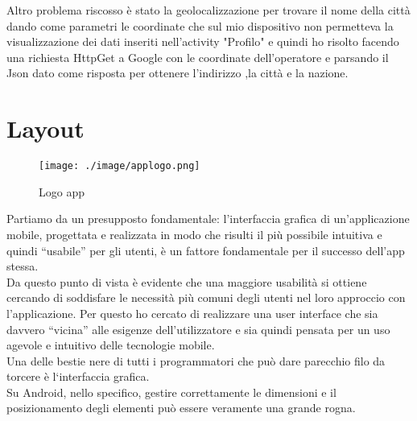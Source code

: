 Altro problema riscosso è stato la geolocalizzazione per trovare il nome della città dando come parametri le coordinate che sul mio dispositivo non permetteva la visualizzazione dei dati inseriti nell'activity "Profilo" e quindi ho risolto facendo una richiesta HttpGet a Google con le coordinate dell'operatore e parsando il Json dato come risposta per ottenere l'indirizzo ,la città e la nazione.

\section{Layout}
\vspace{2em}

\begin{wrapfigure}{L}{0.45\textwidth}
\centering
\texttt{[image: ./image/applogo.png]}
\caption{\label{fig:login}Logo app}
\end{wrapfigure}

Partiamo da un presupposto fondamentale: l’interfaccia grafica di un’applicazione mobile, progettata e realizzata in modo che risulti il più possibile intuitiva e quindi “usabile” per gli utenti, è un fattore fondamentale per il successo dell’app stessa.\\ 
Da questo punto di vista è evidente che una maggiore usabilità si ottiene cercando di soddisfare le necessità più comuni degli utenti nel loro approccio con l’applicazione.
Per questo ho cercato di realizzare una user interface che sia davvero “vicina” alle esigenze dell'utilizzatore e sia quindi pensata per un uso agevole e intuitivo delle tecnologie mobile.\\

Una delle bestie nere di tutti i programmatori che può dare parecchio filo da torcere è l‘interfaccia grafica.\\ 
Su Android, nello specifico, gestire correttamente le dimensioni e il posizionamento degli elementi può essere veramente una grande rogna.\\

